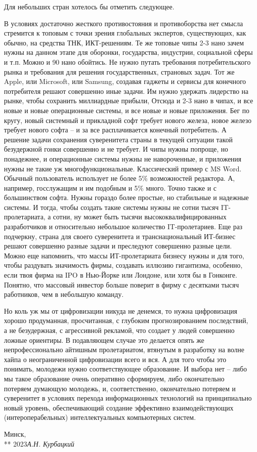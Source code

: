 Для небольших стран хотелось бы отметить следующее. 

В условиях достаточно жесткого противостояния и противоборства нет смысла стремится к топовым с точки зрения глобальных экспертов, существующих, как обычно,  на средства ТНК, ИКТ-решениям. Те же топовые чипы 2-3 нано зачем нужны на данном этапе для оборонки, государства, индустрии, социальной сферы и т.п. Можно и 90 нано обойтись. Не нужно путать требования потребительского рынка и требования для решения государственных, страновых задач. Тот же Apple,  или Microsoft, или Samsung, создавая гаджеты и сервисы для конечного потребителя решают совершенно иные задачи. Им нужно удержать лидерство на рынке, чтобы сохранить миллиардные прибыли, Отсюда и 2-3 нано в чипах, и все новые и новые операционные системы, и все новые и новые приложения. Бег по кругу, новый системный и прикладной софт  требует нового железа, новое железо требует нового софта -- и за все расплачивается конечный потребитель. А решение задачи сохранения суверенитета страны в текущей ситуации  такой безудержной гонки совершенно и не требует. И чипы нужны попроще, но понадежнее, и операционные системы нужны не навороченные, и приложения нужны не такие уж многофункциональные. Классический пример с MS Word. Обычный пользователь использует не более 5\% возможностей редактора. А, например, госслужащим и им подобным и 5\% много. Точно также и с большинством  софта. Нужны гораздо более простые, но стабильные и надежные системы. И тогда, чтобы создать такие системы нужны не сотни тысяч IT-пролетариата, а сотни, ну может быть тысячи высококвалифицированных разработчиков и относительно небольшое количество IT-пролетариев. Еще раз подчеркну,  страна для своего суверенитета и транснациональный ИТ-бизнес решают совершенно разные задачи и преследуют совершенно разные цели. Можно еще напомнить, что массы ИТ-пролетариата бизнесу нужны  и для того, чтобы раздувать значимость фирмы, создавать иллюзию гигантизма, особенно, если твоя фирма на IPO в Нью-Йорке или Лондоне, или хотя бы в Гонконге. Понятно, что массовый инвестор больше поверит в фирму с десятками тысяч работников, чем в небольшую команду. 

Но коль уж мы от цифровизации никуда не денемся, то нужна цифровизация хорошо продуманная, просчитанная, с глубоким прогнозированием последствий, а не безудержная, с агрессивной рекламой, что создает у людей совершенно ложные ориентиры. В подавляющем случае это делается опять же непрофессионально айтишным пролетариатом, втянутым в разработку на волне хайпа о неограниченной цифровизации всего и вся. А для того чтобы это понимать, молодежи нужно соответствующее образование. И выбора нет -- либо мы такое образование очень оперативно сформируем, либо окончательно потеряем думающую молодежь, и, соответственно, окончательно потеряем и суверенитет в условиях перехода информационных технологий на принципиально новый уровень, обеспечивающий создание эффективно взаимодействующих (интероперабельных) интеллектуальных компьютерных систем.
 
\vspace{\baselineskip}
\begin{flushright}\noindent
Минск,\hfill {\it ~~~}\\
** 2023\hfill {\it А.Н. Курбацкий}\\
\end{flushright}


